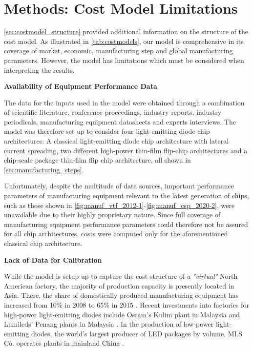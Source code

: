 \documentclass[parskip=full]{article}
\begin{document}
\clearpage
\section{Methods: Cost Model Limitations}
\label{sec:costmodel_limitations}

\cref{sec:costmodel_structure} provided additional information on the structure of the cost model. As illustrated in \cref{tab:costmodels}, our model is comprehensive in its coverage of market, economic, manufacturing step and global manufacturing parameters. However, the model has limitations which must be considered when interpreting the results.

\textbf{Availability of Equipment Performance Data}

The data for the inputs used in the model were obtained through a combination of scientific literature, conference proceedings, industry reports, industry periodicals, manufacturing equipment datasheets and experts interviews. The model was therefore set up to consider four light-emitting diode chip architectures: A classical light-emitting diode chip architecture with lateral current spreading, two diﬀerent high-power thin-ﬁlm ﬂip-chip architectures and a chip-scale package thin-ﬁlm ﬂip chip architecture, all shown in \cref{sec:manufacturing_steps}.

Unfortunately, despite the multitude of data sources, important performance parameters of  manufacturing equipment relevant to the latest generation of chips, such as those shown in \cref{fig:manuf_vtf_2012-1}-\cref{fig:manuf_csp_2020-2}, were unavailable due to their highly proprietary nature. Since full coverage of manufacturing equipment performance parameters could therefore not be assured for all chip architectures, costs were computed only for the aforementioned classical chip architecture.

\textbf{Lack of Data for Calibration}

While the model is setup up to capture the cost structure of a \textit{"virtual"} North American factory, the majority of production capacity is presently located in Asia. There, the share of domestically produced manufacturing equipment has increased from 10\% in 2008 to 65\% in 2015 \cite{tseng2015fab}. Recent investments into factories for high-power light-emitting diodes include Osram's Kulim plant in Malaysia \cite{osram2020kulim} and Lumileds' Penang plants in Malaysia \cite{lumileds2020penang}. In the production of low-power light-emitting diodes, the world's largest producer of LED packages by volume, MLS Co. operates plants in mainland China \cite{mls2020dev}. 
\end{document}

